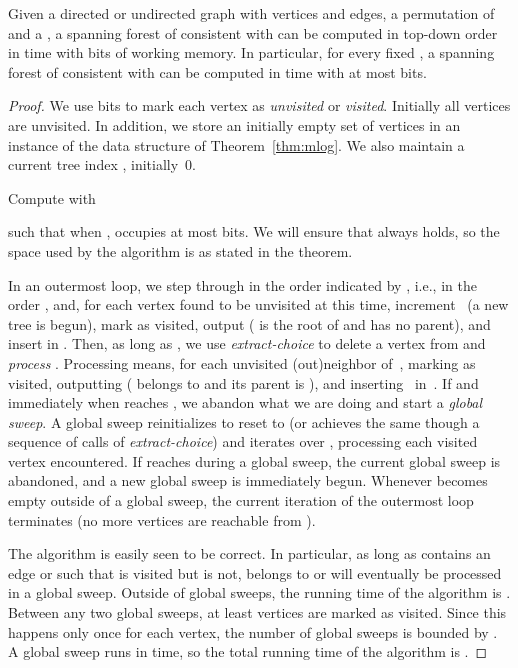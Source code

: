 \documentclass[envcountsame,envcountsect,undated,nolinenumbers]{lnthi}
\def\Tvn#1{\hbox{\textit{#1\/}}}
\begin{document}
\begin{theorem}
\label{thm:cc}Given a directed or undirected graph 
with  vertices and  edges,
a permutation  of  and a ,
a spanning forest of  consistent with 
can be computed in
top-down order in
 time with
 bits of working memory.
In particular, for every fixed ,
a spanning forest of  consistent with 
can be computed in  time
with at most  bits.
\end{theorem}

\begin{proof}
We use  bits to mark each vertex as
\Tvn{unvisited} or \Tvn{visited}.
Initially all vertices are unvisited.
In addition, we store an
initially empty set  of vertices in
an instance  of the data structure
of Theorem~\ref{thm:mlog}.
We also maintain a current tree index ,
initially~0.

Compute  with

such that when ,  occupies
at most  bits.
We will ensure that  always holds,
so the space used by the algorithm
is as stated in the theorem.

In an outermost loop, we step through  in the
order indicated by , i.e.,
in the order , and,
for each vertex  found to be unvisited at this time,
increment~
(a new tree  is begun), mark  as
visited, output
 ( is the root of 
and has no parent),
and insert  in .
Then, as long as , we use
\Tvn{extract-choice} to delete a vertex 
from  and \emph{process} .
Processing  means, for each unvisited (out)neighbor  of~,
marking  as visited,
outputting 
( belongs to  and its parent is ), and
inserting~ in~.
If and immediately when  reaches , we abandon what
we are doing and start a \emph{global sweep}.
A global sweep reinitializes  to reset
 to 
(or achieves the same though a sequence of
calls of \Tvn{extract-choice})
and iterates over , processing each visited vertex encountered.
If  reaches  during a global sweep,
the current global sweep is abandoned, and a new
global sweep is immediately begun.
Whenever  becomes empty outside of a global sweep,
the current iteration of the outermost loop
terminates (no more vertices are reachable from ).

The algorithm is easily seen to be correct.
In particular, as long as  contains an edge 
or  such that  is visited but  is not,
 belongs to  or will eventually be processed
in a global sweep.
Outside of global sweeps, the running time of
the algorithm is .
Between any two global sweeps, at least  vertices
are marked as visited.
Since this happens only once for each vertex,
the number of global sweeps is bounded by
.
A global sweep runs in  time, so the
total running time of the algorithm is
.
\end{proof}
\end{document}
